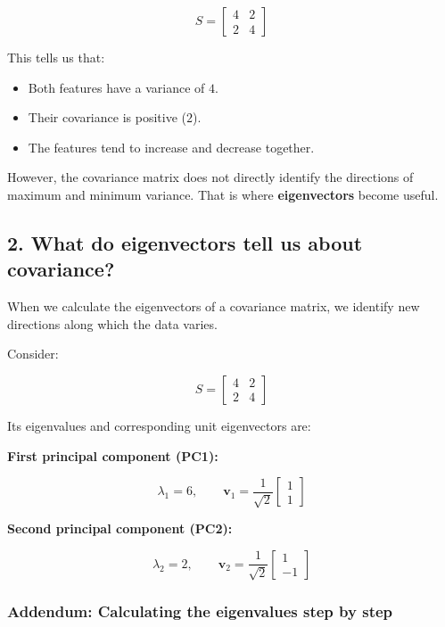\documentclass[11pt]{article}
\providecommand{\tightlist}{%
      \setlength{\itemsep}{0pt}\setlength{\parskip}{0pt}}
\begin{document}
\[
S =
\begin{bmatrix}
4 & 2 \\
2 & 4
\end{bmatrix}
\]

This tells us that:

\begin{itemize}
\tightlist
\item
  Both features have a variance of \(4\).
\item
  Their covariance is positive (\(2\)).
\item
  The features tend to increase and decrease together.
\end{itemize}

However, the covariance matrix does not directly identify the directions
of maximum and minimum variance. That is where \textbf{eigenvectors}
become useful.

\subsection{2. What do eigenvectors tell us about
covariance?}\label{what-do-eigenvectors-tell-us-about-covariance}

When we calculate the eigenvectors of a covariance matrix, we identify
new directions along which the data varies.

Consider:

\[
S =
\begin{bmatrix}
4 & 2 \\
2 & 4
\end{bmatrix}
\]

Its eigenvalues and corresponding unit eigenvectors are:

\textbf{First principal component (PC1):}

\[
\lambda_1 = 6,
\qquad
\mathbf{v}_1 =
\frac{1}{\sqrt{2}}
\begin{bmatrix}
1 \\
1
\end{bmatrix}
\]

\textbf{Second principal component (PC2):}

\[
\lambda_2 = 2,
\qquad
\mathbf{v}_2 =
\frac{1}{\sqrt{2}}
\begin{bmatrix}
1 \\
-1
\end{bmatrix}
\]

\subsubsection{Addendum: Calculating the eigenvalues step by
step}\label{addendum-calculating-the-eigenvalues-step-by-step}
\end{document}

